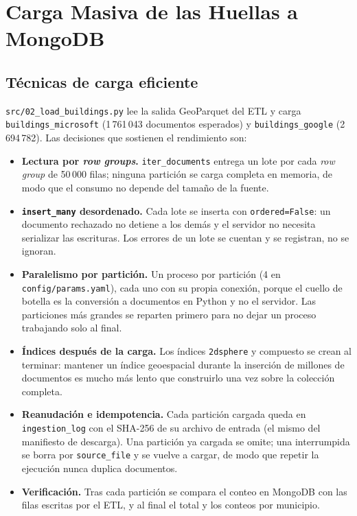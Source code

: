 \providecommand{\pend}[1]{\textcolor{red}{\textbf{[#1]}}}

\section{Carga Masiva de las Huellas a MongoDB}

\subsection{Técnicas de carga eficiente}
\texttt{src/02\_load\_buildings.py} lee la salida GeoParquet del ETL y carga \texttt{buildings\_microsoft} (1\,761\,043 documentos esperados) y \texttt{buildings\_google} (2\,694\,782). Las decisiones que sostienen el rendimiento son:

\begin{itemize}
  \item \textbf{Lectura por \emph{row groups}.} \texttt{iter\_documents} entrega un lote por cada \emph{row group} de 50\,000 filas; ninguna partición se carga completa en memoria, de modo que el consumo no depende del tamaño de la fuente.
  \item \textbf{\texttt{insert\_many} desordenado.} Cada lote se inserta con \texttt{ordered=False}: un documento rechazado no detiene a los demás y el servidor no necesita serializar las escrituras. Los errores de un lote se cuentan y se registran, no se ignoran.
  \item \textbf{Paralelismo por partición.} Un proceso por partición (4 en \texttt{config/params.yaml}), cada uno con su propia conexión, porque el cuello de botella es la conversión a documentos en Python y no el servidor. Las particiones más grandes se reparten primero para no dejar un proceso trabajando solo al final.
  \item \textbf{Índices después de la carga.} Los índices \texttt{2dsphere} y compuesto se crean al terminar: mantener un índice geoespacial durante la inserción de millones de documentos es mucho más lento que construirlo una vez sobre la colección completa.
  \item \textbf{Reanudación e idempotencia.} Cada partición cargada queda en \texttt{ingestion\_log} con el SHA-256 de su archivo de entrada (el mismo del manifiesto de descarga). Una partición ya cargada se omite; una interrumpida se borra por \texttt{source\_file} y se vuelve a cargar, de modo que repetir la ejecución nunca duplica documentos.
  \item \textbf{Verificación.} Tras cada partición se compara el conteo en MongoDB con las filas escritas por el ETL, y al final el total y los conteos por municipio.
\end{itemize}

